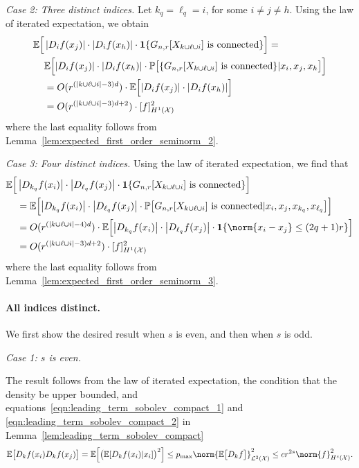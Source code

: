 \documentclass{article}
\newcommand{\abs}[1]{\left \lvert #1 \right \rvert}
\newcommand{\1}{\mathbf{1}}
\newcommand{\Xset}{\mathcal{X}}
\newcommand{\Leb}{\mathcal{L}}
\newcommand{\Pbb}{\mathbb{P}}
\newcommand{\Ebb}{\mathbb{E}}
\theoremstyle{alden}
\theoremstyle{aldenthm}
\theoremstyle{definition}
\theoremstyle{remark}
\begin{document}
\textit{Case 2: Three distinct indices.}
Let $k_q = \ell_q = i$, for some $i \neq j \neq h$. Using the law of iterated expectation, we obtain
\begin{align*}
\Ebb \Bigl[ & \abs{D_{i}f(x_j)} \cdot \abs{D_if(x_h)} \cdot \1\{G_{n,r}[X_{k \cup \ell \cup i}] ~\textrm{is connected} \}\Bigr] = \nonumber \\
& \Ebb\Bigl[\abs{D_{i}f(x_j)} \cdot \abs{D_if(x_h)} \cdot \Pbb\bigl[\{G_{n,r}[X_{k \cup \ell \cup i}] ~\textrm{is connected} \} |x_i,x_j,x_h\bigr]\Bigr] \nonumber \\
& = O(r^{(\abs{k \cup \ell \cup i} - 3)d}) \cdot \Ebb\Bigl[\abs{D_{i}f(x_j)} \cdot \abs{D_if(x_h)} \Bigr] \nonumber \\
& = O(r^{(\abs{k \cup \ell \cup i} - 3)d + 2})\cdot[f]_{H^1(\Xset)}^2
\end{align*}
where the last equality follows from Lemma~\ref{lem:expected_first_order_seminorm_2}.


\textit{Case 3: Four distinct indices.}
Using the law of iterated expectation, we find that
\begin{align*}
\Ebb\Bigl[ &\abs{D_{k_q}f(x_i)}\cdot{\abs{D_{\ell_q}f(x_j)}} \cdot \1\{G_{n,r}[X_{k \cup \ell \cup i}] ~\textrm{is connected} \}\Bigr] \\
& = \Ebb\Bigl[\abs{D_{k_q}f(x_i)}\cdot{\abs{D_{\ell_q}f(x_j)}} \cdot\Pbb\bigl[G_{n,r}[X_{k \cup \ell \cup i}] ~\textrm{is connected}|x_i,x_j,x_{k_q},x_{\ell_q}\bigr]\Bigr] \\
& = O(r^{(\abs{k \cup \ell \cup i} - 4)d}) \cdot \Ebb\Bigl[\abs{D_{k_q}f(x_i)}\cdot{\abs{D_{\ell_q}f(x_j)}}\cdot\1\{\norm{x_i - x_j} \leq (2q + 1)r\}\Bigr] \\
& = O(r^{(\abs{k \cup \ell \cup i} - 3)d + 2}) \cdot [f]_{H^1(\Xset)}^2
\end{align*}
where the last equality follows from Lemma~\ref{lem:expected_first_order_seminorm_3}.

\paragraph{All indices distinct.}

We first show the desired result when $s$ is even, and then when $s$ is odd. 

\textit{Case 1: $s$ is even.}

The result follows from the law of iterated expectation, the condition that the density be upper bounded, and equations~\eqref{eqn:leading_term_sobolev_compact_1} and \eqref{eqn:leading_term_sobolev_compact_2} in Lemma~\ref{lem:leading_term_sobolev_compact}
\begin{equation*}
\Ebb\bigl[D_kf(x_i)D_kf(x_j)\bigr] = \Ebb\Bigl[\bigl(\Ebb[D_kf(x_i)|x_i]\bigr)^2\Bigr] \leq p_{\max} \norm{\Ebb\bigl[D_kf\bigr]}_{\Leb^2(\Xset)}^2 \leq c r^{2s} \norm{f}_{H^s(\Xset)}^2.
\end{equation*}
\end{document}
